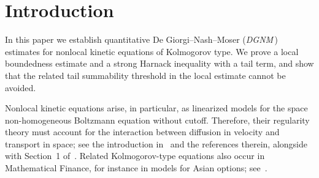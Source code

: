 \documentclass[leqno,10pt]{amsart}
\theoremstyle{plain}
\theoremstyle{remark}
\numberwithin{equation}{section}
\begin{document}
\begin{abstract} 
We extend the De Giorgi--Nash--Moser theory to nonlocal hypoelliptic equations arising in kinetic theory as linearized models for the non-cutoff Boltzmann equation.
Assuming that the nonlocal tail in velocity of weak solutions belongs locally to~$L^p_{t,x}$ for some
$p>N_{\tt d}/(2s)$, where~$N_{\tt d}$ is the drift homogeneous dimension and~$2s\in(0,2)$ is the order of diffusion, we prove a local~$L^2$-$L^\infty$ estimate, from which we also deduce a nonlocal strong Harnack inequality.
The tail summability threshold for the local estimate is optimal: for every~$1\leq p \leq N_{\tt d}/(2s)$, we construct a family of nonnegative, time-dependent solutions that rules out this estimate even for
the pure fractional Kolmogorov equation. 
The local boundedness estimate also allows for possibly unbounded source terms.
 \end{abstract}





\maketitle


\vspace{-3mm}
\setcounter{tocdepth}{1}
\tableofcontents 

\section{Introduction} 





In this paper we establish quantitative De Giorgi--Nash--Moser ({\it DGNM}\,) estimates for nonlocal kinetic equations of Kolmogorov type.  We prove a local boundedness estimate and a strong Harnack inequality with a tail term, and show that the related tail summability threshold in the local estimate cannot be avoided. 

\smallskip


Nonlocal kinetic equations arise, in particular, as linearized models for the space non-homogeneous Boltzmann equation without cutoff. Therefore, their regularity theory must account for the interaction between diffusion in velocity and transport in space; see the introduction in~\cite{Mou18} and the references therein, alongside with Section~1 of~\cite{Sto19}.
Related Kolmogorov-type equations also occur in Mathematical Finance, for instance in models for Asian options; see~\cite{PasBook}.
\end{document}
